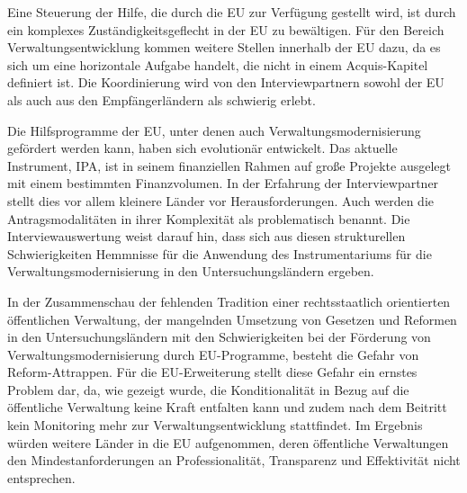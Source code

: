 Eine Steuerung der Hilfe, die durch die EU zur Verfügung gestellt wird, ist durch ein komplexes Zuständigkeitsgeflecht in der EU zu bewältigen. Für den Bereich Verwaltungsentwicklung kommen weitere Stellen innerhalb der EU dazu, da es sich um eine horizontale Aufgabe handelt, die nicht in einem Acquis-Kapitel definiert ist. Die Koordinierung wird von den Interviewpartnern sowohl der EU als auch aus den Empfängerländern als schwierig erlebt. \par
Die Hilfsprogramme der EU, unter denen auch Verwaltungsmodernisierung gefördert werden kann, haben sich evolutionär entwickelt. Das aktuelle Instrument, IPA, ist in seinem finanziellen Rahmen auf große Projekte ausgelegt mit einem bestimmten Finanzvolumen. In der Erfahrung der Interviewpartner stellt dies vor allem kleinere Länder vor Herausforderungen. Auch werden die Antragsmodalitäten in ihrer Komplexität als problematisch benannt. Die Interviewauswertung weist darauf hin, dass sich aus diesen strukturellen Schwierigkeiten Hemmnisse für die Anwendung des Instrumentariums für die Verwaltungsmodernisierung in den Untersuchungsländern ergeben. \par
In der Zusammenschau der fehlenden Tradition einer rechtsstaatlich orientierten öffentlichen Verwaltung, der mangelnden Umsetzung von Gesetzen und Reformen in den Untersuchungsländern mit den Schwierigkeiten bei der Förderung von Verwaltungsmodernisierung durch EU-Programme, besteht die Gefahr von Reform-Attrappen. Für die EU-Erweiterung stellt diese Gefahr ein ernstes Problem dar, da, wie gezeigt wurde, die Konditionalität in Bezug auf die öffentliche Verwaltung keine Kraft entfalten kann und zudem nach dem Beitritt kein Monitoring mehr zur Verwaltungsentwicklung stattfindet. Im Ergebnis würden weitere Länder in die EU aufgenommen, deren öffentliche Verwaltungen den Mindestanforderungen an Professionalität, Transparenz und Effektivität nicht entsprechen. 

